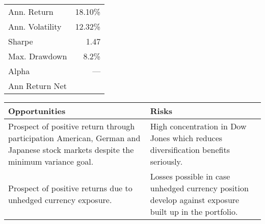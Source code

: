 \documentclass{scrreprt}
\begin{document}
\begin{minipage}{0.65\textwidth}
\end{minipage}
\begin{minipage}{0.5\textwidth}
\begin{tabular}{lr}
  \toprule
  Ann. Return & 18.10\%\\
  Ann. Volatility & 12.32\%\\
  Sharpe & 1.47\\
  Max. Drawdown& 8.2\%\\
  Alpha & ---\\
  Ann Return Net & \\
  \bottomrule
\end{tabular}
\end{minipage}

\begin{table}[H]
\begin{tabularx}{\textwidth}{XX}
  \toprule
  \textbf{\textsf{Opportunities}} & \textbf{\textsf{Risks}} \\
  \midrule
Prospect of positive return through participation American, German and Japanese stock markets despite the minimum variance goal. &
High concentration in Dow Jones which reduces diversification benefits seriously.\\[1em]
Prospect of positive returns due to unhedged currency exposure. &
Losses possible in case unhedged currency position develop against exposure built up in the portfolio.\\
  \bottomrule
\end{tabularx}
\end{table}

\end{document}
